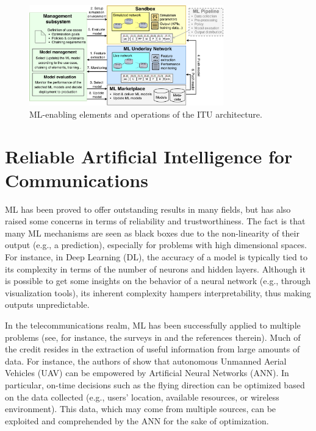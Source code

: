 \documentclass[journal]{IEEEtran}
\begin{document}
	\begin{figure}[ht!]
		\centering
		\includegraphics[width=0.75\textwidth]{architecture_example.pdf}
		\caption{ML-enabling elements and operations of the ITU architecture.}
		\label{fig:example_simulator}
	\end{figure}
	
	\section{Reliable Artificial Intelligence for Communications}
	
	ML has been proved to offer outstanding results in many fields, but has also raised some concerns in terms of reliability and trustworthiness. The fact is that many ML mechanisms are seen as black boxes due to the non-linearity of their output (e.g., a prediction), especially for problems with high dimensional spaces. For instance, in Deep Learning (DL), the accuracy of a model is typically tied to its complexity in terms of the number of neurons and hidden layers. Although it is possible to get some insights on the behavior of a neural network (e.g., through visualization tools), its inherent complexity hampers interpretability, thus making outputs unpredictable.
	
	In the telecommunications realm, ML has been successfully applied to multiple problems (see, for instance, the surveys in \cite{survey2,survey3,survey4,survey5,survey6} and the references therein). Much of the credit resides in the extraction of useful information from large amounts of data. For instance, the authors of \cite{survey4} show that autonomous Unmanned Aerial Vehicles (UAV) can be empowered by Artificial Neural Networks (ANN). In particular, on-time decisions such as the flying direction can be optimized based on the data collected (e.g., users' location, available resources, or wireless environment). This data, which may come from multiple sources, can be exploited and comprehended by the ANN for the sake of optimization.
	
\end{document}
